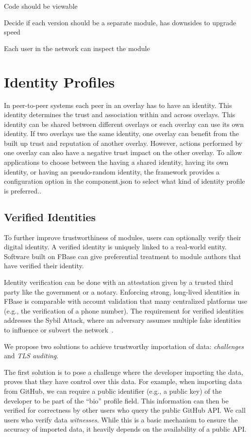 Code should be viewable

Decide if each version should be a separate module, has downsides to upgrade speed

Each user in the network can inspect the module  

\section{Identity Profiles}

In peer-to-peer systems each peer in an overlay has to have an identity. This identity determines the trust and association within and across overlays. This identity can be shared between different overlays or each overlay can use its own identity. If two overlays use the same identity, one overlay can benefit from the built up trust and reputation of another overlay. However, actions performed by one overlay can also have a negative trust impact on the other overlay. To allow applications to choose between the having a shared identity, having its own identity, or having an pseudo-random identity,  the framework provides a configuration option in the component.json to select what kind of identity profile is preferred..  

\subsection{Verified Identities}
\label{subsec:strong_identities}
To further improve trustworthiness of modules, users can optionally verify their digital identity.
A verified identity is uniquely linked to a real-world entity.
Software built on FBase can give preferential treatment to module authors that have verified their identity.

Identity verification can be done with an attestation given by a trusted third party like the government or a notary.
Enforcing strong, long-lived identities in FBase is comparable with account validation that many centralized platforms use (e.g., the verification of a phone number).
The requirement for verified identities addresses the Sybil Attack, where an adversary assumes multiple fake identities to influence or subvert the network~\cite{douceur2002sybil}.

We propose two solutions to achieve trustworthy importation of data: \textit{challenges} and \textit{TLS auditing}.

The first solution is to pose a challenge where the developer importing the data, proves that they have control over this data.
For example, when importing data from GitHub, we can require a public identifier (e.g., a public key) of the developer to be part of the \enquote{bio} profile field.
This information can then be verified for correctness by other users who query the public GitHub API.
We call users who verify data \emph{witnesses}.
While this is a basic mechanism to ensure the accuracy of imported data, it heavily depends on the availability of a public API.


